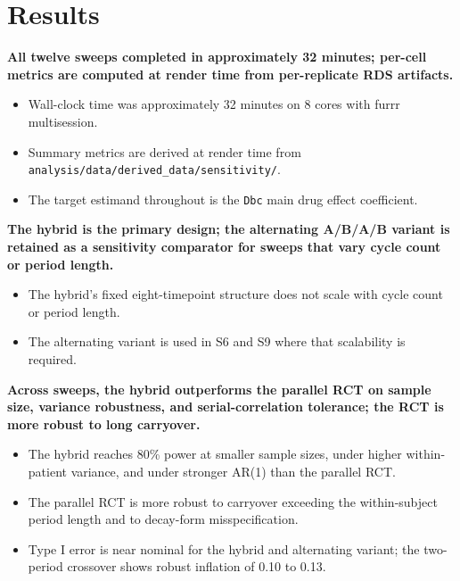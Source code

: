 \documentclass[
  11pt,
]{article}
\begin{document}
\section{Results}\label{results}

\textbf{All twelve sweeps completed in approximately 32 minutes; per-cell metrics are computed at render time from per-replicate RDS artifacts.}

\begin{itemize}\setlength{\itemsep}{2pt}\setlength{\parskip}{0pt}
\item Wall-clock time was approximately 32 minutes on 8 cores with furrr multisession.
\item Summary metrics are derived at render time from \texttt{analysis/data/derived\_data/sensitivity/}.
\item The target estimand throughout is the \texttt{Dbc} main drug effect coefficient.
\end{itemize}

\textbf{The hybrid is the primary design; the alternating A/B/A/B variant is retained as a sensitivity comparator for sweeps that vary cycle count or period length.}

\begin{itemize}\setlength{\itemsep}{2pt}\setlength{\parskip}{0pt}
\item The hybrid's fixed eight-timepoint structure does not scale with cycle count or period length.
\item The alternating variant is used in S6 and S9 where that scalability is required.
\end{itemize}

\textbf{Across sweeps, the hybrid outperforms the parallel RCT on sample size, variance robustness, and serial-correlation tolerance; the RCT is more robust to long carryover.}

\begin{itemize}\setlength{\itemsep}{2pt}\setlength{\parskip}{0pt}
\item The hybrid reaches 80\% power at smaller sample sizes, under higher within-patient variance, and under stronger AR(1) than the parallel RCT.
\item The parallel RCT is more robust to carryover exceeding the within-subject period length and to decay-form misspecification.
\item Type I error is near nominal for the hybrid and alternating variant; the two-period crossover shows robust inflation of 0.10 to 0.13.
\end{itemize}
\end{document}
